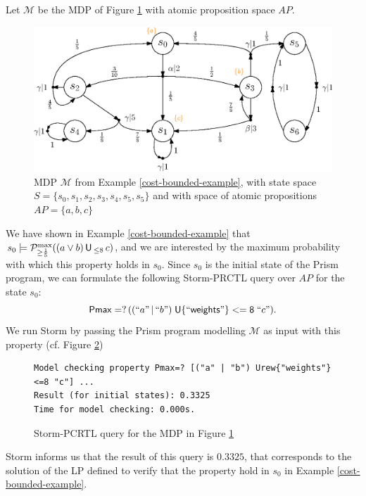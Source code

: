 \begin{example}
  Let $\mathcal{M}$ be the MDP of Figure \ref{cost-bounded-until5} with atomic proposition space $AP$.
  \begin{figure}[h]
  \centering
  \includegraphics[width=0.7\linewidth]{resources/MDPExample}
  
  \captionsetup{justification=centering}
  \caption{MDP $\mathcal{M}$ from Example \ref{cost-bounded-example}, with state space $S=\{s_0, s_1, s_2, s_3, s_4, s_5, s_5\}$ and with space of atomic propositions $AP = \{a, b, c\}$}
  \label{cost-bounded-until5}
  \end{figure}
  We have shown in Example \ref{cost-bounded-example} that $s_0 \models \mathcal{P}^{\max}_{\geq \frac{1}{5}}((a \vee b) \,\text{\sffamily U}\,_{\leq 8} \, c)$, and we are interested by the maximum probability with which this property holds in $s_0$. Since $s_0$ is the initial state of the Prism program, we can formulate the following Storm-PRCTL query over $AP$ for the state $s_0$:
  \[
    \mathsf{Pmax =? \, ((}``a" \, | \, ``b"\mathsf{) \; U\{``weights"\}<= 8 \;} ``c").
  \]
  We run Storm by passing the Prism program modelling $\mathcal{M}$ as input with this property (cf. Figure \ref{storm-program-3})
\begin{figure}[h!]
  {\footnotesize
%
  \begin{verbatim}
Model checking property Pmax=? [("a" | "b") Urew{"weights"}<=8 "c"] ...
Result (for initial states): 0.3325
Time for model checking: 0.000s.
\end{verbatim}
  }
  \captionsetup{justification=centering}
  \caption{Storm-PCRTL query for the MDP in Figure \ref{cost-bounded-until5}}
  \label{storm-program-3}
\end{figure}
Storm informs us that the result of this query is $0.3325$, that corresponds to the solution of the LP defined to verify that the property hold in $s_0$ in Example \ref{cost-bounded-example}.
\end{example}

